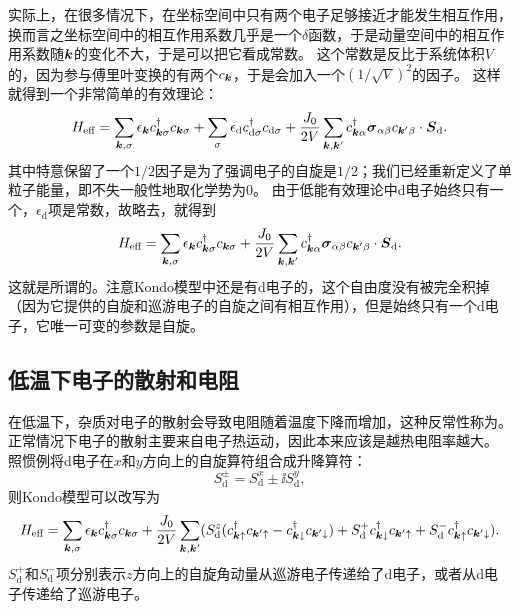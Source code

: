 实际上，在很多情况下，在坐标空间中只有两个电子足够接近才能发生相互作用，换而言之坐标空间中的相互作用系数几乎是一个$\delta$函数，于是动量空间中的相互作用系数随$\vb*{k}$的变化不大，于是可以把它看成常数。
这个常数是反比于系统体积$V$的，因为参与傅里叶变换的有两个${c}_{\vb*{k}}$，于是会加入一个$(1/\sqrt{V})^2$的因子。
这样就得到一个非常简单的有效理论：
\[
    {H}_\text{eff} = \sum_{\vb*{k}, \sigma} \epsilon_{\vb*{k}} {c}_{\vb*{k}\sigma}^\dagger {c}_{\vb*{k} \sigma} + \sum_\sigma \epsilon_\text{d} {c}_{\text{d}\sigma}^\dagger {c}_{\text{d} \sigma} + \frac{J_0}{2V} \sum_{\vb*{k}, \vb*{k}'} {c}^\dagger_{\vb*{k} \alpha} \vb*{\sigma}_{\alpha \beta} {c}_{\vb*{k}' \beta} \cdot {\vb*{S}}_\text{d}.
\]
其中特意保留了一个$1/2$因子是为了强调电子的自旋是$1/2$；我们已经重新定义了单粒子能量，即不失一般性地取化学势为$0$。%
由于低能有效理论中d电子始终只有一个，$\epsilon_\text{d}$项是常数，故略去，就得到
\begin{equation}
    {H}_\text{eff} = \sum_{\vb*{k}, \sigma} \epsilon_{\vb*{k}} {c}_{\vb*{k}\sigma}^\dagger {c}_{\vb*{k} \sigma} + \frac{J_0}{2V} \sum_{\vb*{k}, \vb*{k}'} {c}^\dagger_{\vb*{k} \alpha} \vb*{\sigma}_{\alpha \beta} {c}_{\vb*{k}' \beta} \cdot {\vb*{S}_\text{d}}.
\end{equation}
这就是所谓的。注意Kondo模型中还是有d电子的，这个自由度没有被完全积掉（因为它提供的自旋和巡游电子的自旋之间有相互作用），但是始终只有一个d电子，它唯一可变的参数是自旋。

\subsection{低温下电子的散射和电阻}

在低温下，杂质对电子的散射会导致电阻随着温度下降而增加，这种反常性称为。正常情况下电子的散射主要来自电子热运动，因此本来应该是越热电阻率越大。
照惯例将d电子在$x$和$y$方向上的自旋算符组合成升降算符：
\begin{equation}
    {S}_\text{d}^{\pm} = {S}_\text{d}^x \pm \ii {S}_\text{d}^y,
\end{equation}
则Kondo模型可以改写为
\begin{equation}
    {H}_\text{eff} = \sum_{\vb*{k}, \sigma} \epsilon_{\vb*{k}} {c}^\dagger_{\vb*{k} \sigma} {c}_{\vb*{k} \sigma} + \frac{J_0}{2V} \sum_{\vb*{k}, \vb*{k}'} (
        {S}_\text{d}^z ({c}^\dagger_{\vb*{k} \uparrow} {c}_{\vb*{k}' \uparrow} - {c}^\dagger_{\vb*{k} \downarrow} {c}_{\vb*{k}' \downarrow})
        + {S}^+_\text{d} {c}^\dagger_{\vb*{k} \downarrow} {c}_{\vb*{k}' \uparrow}
        + {S}^-_\text{d} {c}^\dagger_{\vb*{k} \uparrow} {c}_{\vb*{k}' \downarrow}
    ).
    \label{eq:kondo-spin-up-down}
\end{equation}
${S}^+_\text{d}$和${S}^-_\text{d}$项分别表示$z$方向上的自旋角动量从巡游电子传递给了d电子，或者从d电子传递给了巡游电子。


